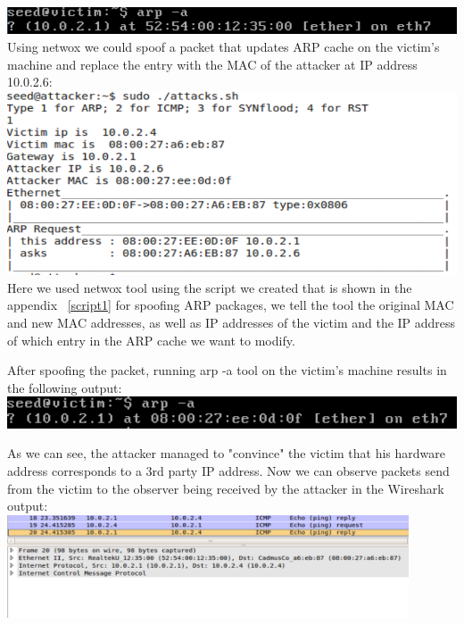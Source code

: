 \documentclass[12pt, a4paper, pdflatex]{article}
\begin{document}
\includegraphics{gfx/arp1}\\


Using netwox we could spoof a packet that updates ARP cache on the victim's machine and replace the entry with the MAC of the attacker at IP address 10.0.2.6:\\

\includegraphics{gfx/arp-attack}\\

Here we used netwox tool using the script we created that is shown in the appendix ~\ref{script1} for spoofing ARP packages, we tell the tool the original MAC and new MAC addresses, as well as IP addresses of the victim and the IP address of which entry in the ARP cache we want to modify.

After spoofing the packet, running arp -a tool on the victim's machine results in the following output:\\

\includegraphics{gfx/arp-after-attack}

As we can see, the attacker managed to "convince" the victim that his hardware address corresponds to a 3rd party IP address. Now we can observe packets send from the victim to the observer being received by the attacker in the Wireshark output:\\

\includegraphics[width=450px]{gfx/arp-shark}
\end{document}
